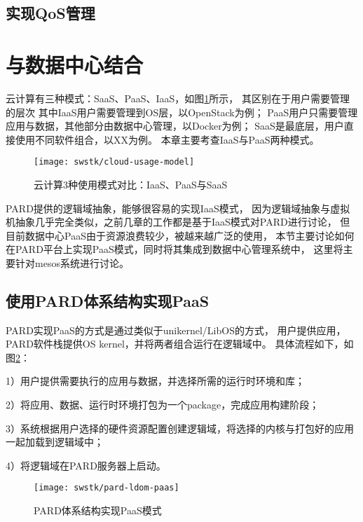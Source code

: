 \subsection{实现QoS管理}


\section{与数据中心结合}

云计算有三种模式：SaaS、PaaS、IaaS，如图\ref{fig:cloud-usage-model}所示，
其区别在于用户需要管理的层次
其中IaaS用户需要管理到OS层，以OpenStack为例；
PaaS用户只需要管理应用与数据，其他部分由数据中心管理，以Docker为例；
SaaS是最底层，用户直接使用不同软件组合，以XX为例。
本章主要考查IaaS与PaaS两种模式。

\begin{figure}[tb]
  \centering
  \texttt{[image: swstk/cloud-usage-model]}
  \caption{云计算3种使用模式对比：IaaS、PaaS与SaaS}
  \label{fig:cloud-usage-model}
\end{figure}

PARD提供的逻辑域抽象，能够很容易的实现IaaS模式，
因为逻辑域抽象与虚拟机抽象几乎完全类似，之前几章的工作都是基于IaaS模式对PARD进行讨论，
但目前数据中心PaaS由于资源浪费较少，被越来越广泛的使用，
本节主要讨论如何在PARD平台上实现PaaS模式，同时将其集成到数据中心管理系统中，
这里将主要针对mesos系统进行讨论。

\subsection{使用PARD体系结构实现PaaS}
PARD实现PaaS的方式是通过类似于unikernel/LibOS的方式，
用户提供应用，PARD软件栈提供OS kernel，并将两者组合运行在逻辑域中。
具体流程如下，如图\ref{fig:pard-ldom-paas}：

1）用户提供需要执行的应用与数据，并选择所需的运行时环境和库；

2）将应用、数据、运行时环境打包为一个package，完成应用构建阶段；

3）系统根据用户选择的硬件资源配置创建逻辑域，将选择的内核与打包好的应用一起加载到逻辑域中；

4）将逻辑域在PARD服务器上启动。

\begin{figure}[tb]
  \centering
  \texttt{[image: swstk/pard-ldom-paas]}
  \caption{PARD体系结构实现PaaS模式}
  \label{fig:pard-ldom-paas}
\end{figure}

